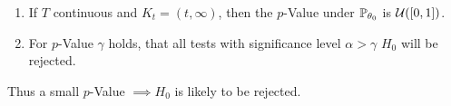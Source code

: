 \pagebreak
\begin{enumerate}
  \item If \(T\) continuous and \(K_t = (t, \infty)\), then the \(p\)-Value under \(\P_{\theta_0}\) is \(\Unif([0, 1])\).
  \item For \(p\)-Value \(\gamma\) holds, that all tests with significance level \(\alpha > \gamma\) \(H_0\) will be rejected.
\end{enumerate}

Thus a small \(p\)-Value \(\implies H_0\) is likely to be rejected.
